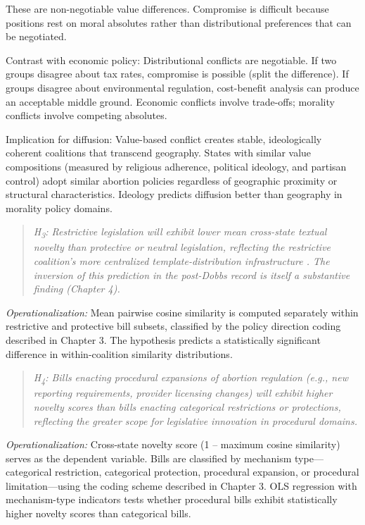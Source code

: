 These are non-negotiable value differences. Compromise is difficult because positions rest on moral absolutes rather than distributional preferences that can be negotiated.

Contrast with economic policy: Distributional conflicts are negotiable. If two groups disagree about tax rates, compromise is possible (split the difference). If groups disagree about environmental regulation, cost-benefit analysis can produce an acceptable middle ground. Economic conflicts involve trade-offs; morality conflicts involve competing absolutes.

Implication for diffusion: Value-based conflict creates stable, ideologically coherent coalitions that transcend geography. States with similar value compositions (measured by religious adherence, political ideology, and partisan control) adopt similar abortion policies regardless of geographic proximity or structural characteristics. Ideology predicts diffusion better than geography in morality policy domains.

\begin{quote}
\textit{H\textsubscript{3}: Restrictive legislation will exhibit lower mean cross-state textual novelty than protective or neutral legislation, reflecting the restrictive coalition's more centralized template-distribution infrastructure \parencite{jansaCopyPasteLawmaking2019}. The inversion of this prediction in the post-\textit{Dobbs} record is itself a substantive finding (Chapter 4).}
\end{quote}

\emph{Operationalization:} Mean pairwise cosine similarity is computed separately within restrictive and protective bill subsets, classified by the policy direction coding described in Chapter 3. The hypothesis predicts a statistically significant difference in within-coalition similarity distributions.

\begin{quote}
\textit{H\textsubscript{4}: Bills enacting procedural expansions of abortion regulation (e.g., new reporting requirements, provider licensing changes) will exhibit higher novelty scores than bills enacting categorical restrictions or protections, reflecting the greater scope for legislative innovation in procedural domains.}
\end{quote}

\emph{Operationalization:} Cross-state novelty score (1 -- maximum cosine similarity) serves as the dependent variable. Bills are classified by mechanism type—categorical restriction, categorical protection, procedural expansion, or procedural limitation—using the coding scheme described in Chapter 3. OLS regression with mechanism-type indicators tests whether procedural bills exhibit statistically higher novelty scores than categorical bills.

